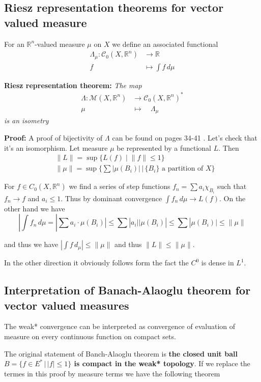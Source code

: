 \documentclass{article}
\begin{document}
\subsection{Riesz representation theorems for vector valued measure}
For an $\mathbb{R}^n$-valued measure $\mu$ on $X$ we define an associated
functional
\begin{align*}
\Lambda_\mu:\mathcal C_0(X,\mathbb{R}^n)&\rightarrow\mathbb{R}\\
f&\mapsto\int f\,d\mu
\end{align*}

\textbf{Riesz representation theorem:} \textit{
The map
\begin{align*}
\Lambda:\mathcal{M}(X, \mathbb{R}^n)&\rightarrow\mathcal{C}_0(X,\mathbb{R}^n)^*\\
\mu\quad&\mapsto\quad\Lambda_\mu
\end{align*}
is an isometry}

\vspace{1ex}
\textbf{Proof:} A proof of bijectivity of $\Lambda$ can be found on pages 34-41
\cite{maggi}. Let's check that it's an isomorphism. Let measure $\mu$ be
represented by a functional $L$. Then 
\begin{align*}
    &\|L\|=\sup\{L(f)\;|\;\|f\|\le1\}\\
    &\|\mu\|=\sup\{\sum|\mu(B_i)|\,|\,\{B_i\}\text{ a partition of } X\}
\end{align*}

For $f\in C_0(X,\mathbb R^n)$ we find a series of step functions $f_n=\sum a_i\chi_{B_i}$ 
such that $f_n\rightarrow f$ and $a_i\leq 1$. Thus by dominant convergence
$\int f_n\,d\mu\rightarrow L(f)$. On the other hand we have
\[|\int f_n\,d\mu = |\sum a_i\cdot\mu(B_i)|\leq\sum|a_i||\mu(B_i)|\leq\sum|\mu(B_i)|\leq\|\mu\|\]

and thus we have $|\int f\,d_\mu|\leq\|\mu\|$ and thus $\|L\|\leq\|\mu\|$.

In the other direction it obviously follows form the fact the $C^0$ is dense
in $L^1$.

\subsection{Interpretation of Banach-Alaoglu theorem for vector valued measures}
The weak* convergence can be interpreted as convergence of evaluation of measure
on every continuous function on compact sets.

\vspace{2ex}
The original statement of Banch-Alaoglu theorem is \textbf{the closed unit ball
$B=\{f\in E^*\,|\,|f|\leq 1\}$ is compact in the weak* topology}. If we replace
the termes in this proof by measure terms we have the following theorem
\end{document}
